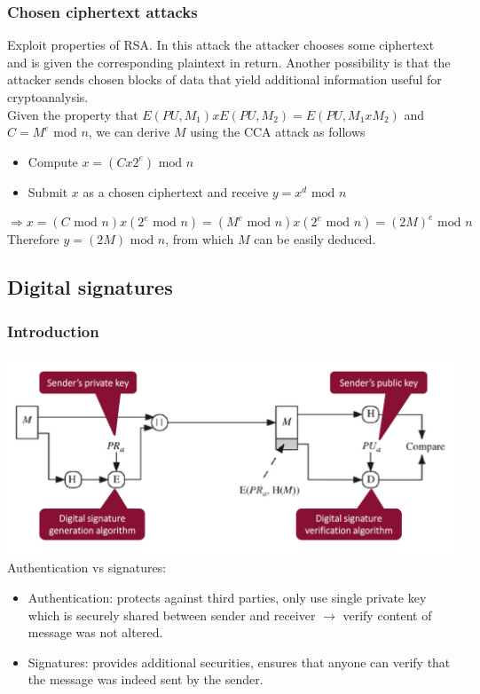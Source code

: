 \documentclass[12pt]{article}
\begin{document}
 \subsubsection{Chosen ciphertext attacks}
 Exploit properties of RSA. In this attack the attacker chooses some ciphertext and is given the corresponding plaintext in return. Another possibility is that the attacker sends chosen blocks of data that yield additional information useful for cryptoanalysis.\\
 Given the property that $E(PU,M_1)xE(PU,M_2) = E(PU, M_1xM_2)$ and $C=M^e\text{ mod }n$, we can derive $M$ using the CCA attack as follows
 \begin{itemize}
 	\item Compute $x = (Cx2^e)\text{ mod }n$
 	\item Submit $x$ as a chosen ciphertext and receive $y = x^d\text{ mod }n$
 \end{itemize}
$\Rightarrow x = (C\text{ mod }n)x(2^e\text{ mod }n) = (M^e\text{ mod }n)x(2^e\text{ mod }n) = (2M)^e\text{ mod }n$\\
Therefore $y = (2M)\text{ mod }n$, from which $M$ can be easily deduced.
 
 \subsection{Digital signatures}
 \subsubsection{Introduction}
 \includegraphics[width=\linewidth]{./slides/L4P5intro.PNG}\\
 Authentication vs signatures:
 \begin{itemize}
 	\item Authentication: protects against third parties, only use single private key which is securely shared between sender and receiver $\rightarrow$ verify content of message was not altered.
 	\item Signatures: provides additional securities, ensures that anyone can verify that the message was indeed sent by the sender.
 \end{itemize}
\end{document}
